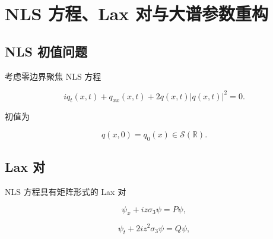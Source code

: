 \documentclass[
    lang=cn,
    scheme=chinese,
    mode=simple,
    device=normal,
    color=blue,
    math=cm,
    thmcnt=section,
    12pt,
    nowatermark
]{elegantbook}
\begin{document}
\section{NLS 方程、Lax 对与大谱参数重构}

\subsection{NLS 初值问题}

考虑零边界聚焦 NLS 方程

\begin{equation}
    iq_t(x,t)+q_{xx}(x,t)+2q(x,t)\lvert q(x,t)\rvert^2=0.
    \tag{5.1.1}
    \label{eq:5.1.1}
\end{equation}

初值为

\begin{equation}
    q(x,0)=q_0(x)\in\mathcal S(\mathbb{R}).
    \tag{5.1.2}
    \label{eq:5.1.2}
\end{equation}




\subsection{Lax 对}

NLS 方程具有矩阵形式的 Lax 对

\begin{equation}
    \psi_x+iz\sigma_3\psi=P\psi,
    \tag{5.1.3}
    \label{eq:5.1.3}
\end{equation}

\begin{equation}
    \psi_t+2iz^2\sigma_3\psi=Q\psi,
    \tag{5.1.4}
    \label{eq:5.1.4}
\end{equation}
\end{document}

